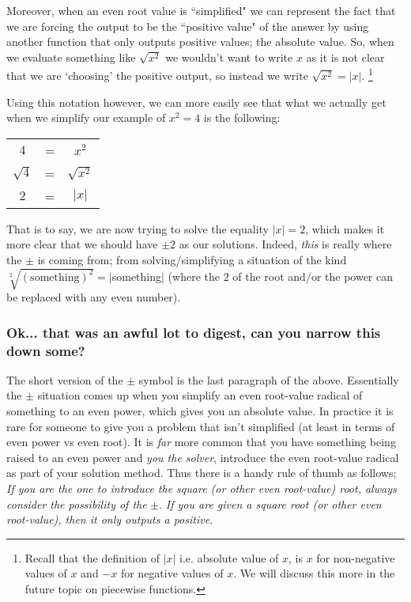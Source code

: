     Moreover, when an even root value is ``simplified" we can represent the fact that we are forcing the output to be the ``positive value" of the answer by using another function that only outputs positive values; the absolute value. So, when we evaluate something like $\sqrt{x^2}$ we wouldn't want to write $x$ as it is not clear that we are `choosing' the positive output, so instead we write $\sqrt{x^2} = |x|$.%
    \footnote{Recall that the definition of $|x|$ i.e. absolute value of $x$, is $x$ for non-negative values of $x$ and $-x$ for negative values of $x$. We will discuss this more in the future topic on piecewise functions.}

    Using this notation however, we can more easily see that what we actually get when we simplify our example of $x^2 = 4$ is the following:\\
    \begin{center}
    \begin{tabular}{ccc}
        $4$ & = & $x^2$ \\
        $\sqrt{4}$ & = & $\sqrt{x^2}$ \\
        $2$ & = & $|x|$
    \end{tabular}
    \end{center}
    That is to say, we are now trying to solve the equality $|x| = 2$, which makes it more clear that we should have $\pm 2$ as our solutions. Indeed, \textit{this} is really where the $\pm$ is coming from; from solving/simplifying a situation of the kind $\sqrt[2]{(\text{something})^2}=|$something$|$ (where the $2$ of the root and/or the power can be replaced with any even number).

\subsubsection*{Ok... that was an awful lot to digest, can you narrow this down some?}

    The short version of the $\pm$ symbol is the last paragraph of the above. Essentially the $\pm$ situation comes up when you simplify an even root-value radical of something to an even power, which gives you an absolute value. In practice it is rare for someone to give you a problem that isn't simplified (at least in terms of even power vs even root). It is \textit{far} more common that you have something being raised to an even power and \textit{you the solver}, introduce the even root-value radical as part of your solution method. Thus there is a handy rule of thumb as follows; \textit{If you are the one to introduce the square (or other even root-value) root, always consider the possibility of the }$\pm$. \textit{If you are given a square root (or other even root-value), then it only outputs a positive.}

